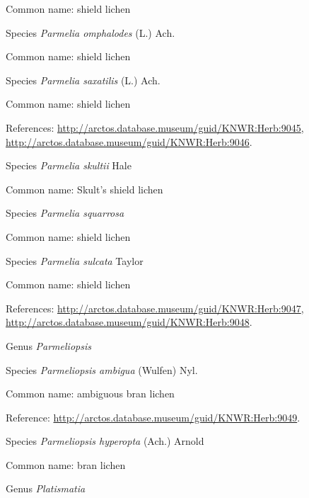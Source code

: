 \documentclass[9pt, article]{memoir}
\begin{document}
\begin{multicols}{2}
Common name: shield lichen

\vspace{6pt}\noindent\hspace{36pt}Species \textit{Parmelia omphalodes} (L.) Ach.


Common name: shield lichen

\vspace{6pt}\noindent\hspace{36pt}Species \textit{Parmelia saxatilis} (L.) Ach.


Common name: shield lichen

References: 
\url{http://arctos.database.museum/guid/KNWR:Herb:9045}, 
\url{http://arctos.database.museum/guid/KNWR:Herb:9046}.

\vspace{6pt}\noindent\hspace{36pt}Species \textit{Parmelia skultii} Hale


Common name: Skult's shield lichen

\vspace{6pt}\noindent\hspace{36pt}Species \textit{Parmelia squarrosa}


Common name: shield lichen

\vspace{6pt}\noindent\hspace{36pt}Species \textit{Parmelia sulcata} Taylor


Common name: shield lichen

References: 
\url{http://arctos.database.museum/guid/KNWR:Herb:9047}, 
\url{http://arctos.database.museum/guid/KNWR:Herb:9048}.

\vspace{6pt}\noindent\hspace{30pt}Genus \textit{Parmeliopsis}


\vspace{6pt}\noindent\hspace{36pt}Species \textit{Parmeliopsis ambigua} (Wulfen) Nyl.


Common name: ambiguous bran lichen

Reference: 
\url{http://arctos.database.museum/guid/KNWR:Herb:9049}.

\vspace{6pt}\noindent\hspace{36pt}Species \textit{Parmeliopsis hyperopta} (Ach.) Arnold


Common name: bran lichen

\vspace{6pt}\noindent\hspace{30pt}Genus \textit{Platismatia}



\end{multicols}
\end{document}
